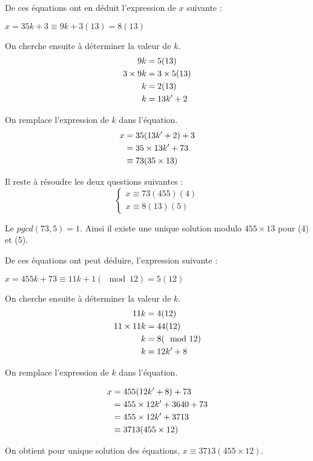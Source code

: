 \documentclass[a4paper,10pt]{article}
\begin{document}
De ces équations ont en déduit l'expression de $x$ suivante :

	\begin{center}
	$x=35k +3 \equiv 9k+3(13)=8(13)$
	\end{center}
	
On cherche ensuite à déterminer la valeur de $k$.
	\begin{align}
		9k &= 5(13) \notag \\
		3 \times 9k &= 3 \times 5(13) \notag \\
		k &=2(13) \notag \\
		k &= 13k'+2 \notag
	\end{align}

On remplace l'expression de $k$	dans l'équation.
	\begin{align}
		x &= 35(13k'+2)+3 \notag \\
		   &= 35 \times 13k' +73 \notag \\
		   &\equiv 73(35 \times 13) \notag
	\end{align}
	
	
Il reste à résoudre les deux questions suivantes :
	\[
	\left\{
	\begin{aligned}	
		x \equiv 73(455) (4)\\	
		x \equiv 8(13) (5)
		\end{aligned}	
	\right.\]
	
	Le $pgcd(73,5)=1$. Ainsi il existe une unique solution modulo $455 \times 13 $ pour (4) et (5).

De ces équations ont peut déduire, l'expression suivante :	
	\begin{center}
	$x=455k +73 \equiv 11k + 1 (\mod 12)=5 (12)$
	\end{center}

On cherche ensuite à déterminer la valeur de $k$.	
	\begin{align}
		11k&=4(12) \notag \\
		11 \times 11k &= 44(12) \notag \\	
		k &= 8(\mod 12) \notag \\
		k &= 12k' +8 \notag
	\end{align}

On remplace l'expression de $k$	dans l'équation.
	
	\begin{align}
		x &= 455(12k'+8)+73 \notag \\
		   &= 455 \times 12k' + 3640 + 73 \notag \\
		   &= 455 \times 12k'+3713 \notag \\
		   &\equiv 3713 (455 \times 12) \notag 
	\end{align}
	
On obtient pour unique solution des équations, $x\equiv 3713 (455 \times 12)$.
	
	
	 
\end{document}
